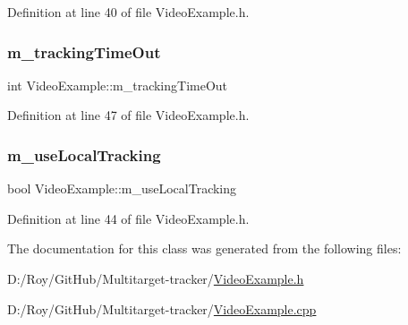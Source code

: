 Definition at line 40 of file Video\+Example.\+h.

\mbox{\label{class_video_example_a47c8dd1d6ec7e8e18a8f7d92536c53a2}} 
\subsubsection{\texorpdfstring{m\+\_\+tracking\+Time\+Out}{m\_trackingTimeOut}}
{\footnotesize\ttfamily int Video\+Example\+::m\+\_\+tracking\+Time\+Out\hspace{0.3cm}{\ttfamily [protected]}}



Definition at line 47 of file Video\+Example.\+h.

\mbox{\label{class_video_example_a951ee017c4fbb180dfc965a9a35ac69f}} 
\subsubsection{\texorpdfstring{m\+\_\+use\+Local\+Tracking}{m\_useLocalTracking}}
{\footnotesize\ttfamily bool Video\+Example\+::m\+\_\+use\+Local\+Tracking\hspace{0.3cm}{\ttfamily [protected]}}



Definition at line 44 of file Video\+Example.\+h.



The documentation for this class was generated from the following files\+:\begin{DoxyCompactItemize}
\item 
D\+:/\+Roy/\+Git\+Hub/\+Multitarget-\/tracker/\mbox{\hyperlink{_video_example_8h}{Video\+Example.\+h}}\item 
D\+:/\+Roy/\+Git\+Hub/\+Multitarget-\/tracker/\mbox{\hyperlink{_video_example_8cpp}{Video\+Example.\+cpp}}\end{DoxyCompactItemize}
